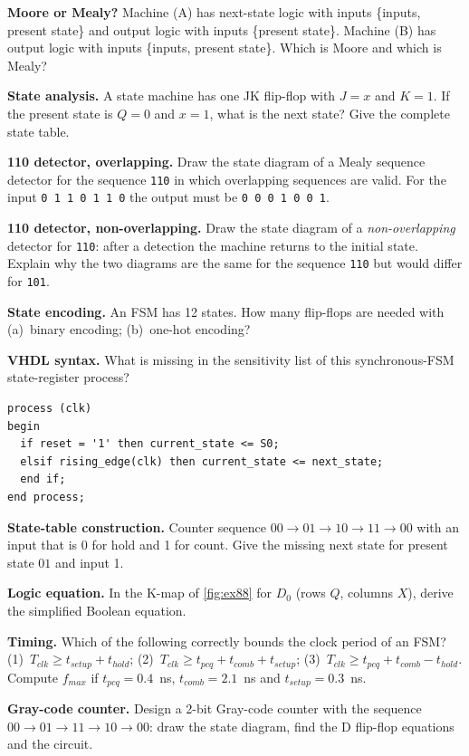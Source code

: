 \begin{exlist}
  \item \textbf{Moore or Mealy?} Machine (A) has next-state logic with inputs \{inputs, present state\} and output logic with inputs \{present state\}. Machine (B) has output logic with inputs \{inputs, present state\}. Which is Moore and which is Mealy?
  \item \textbf{State analysis.} A state machine has one JK flip-flop with $J=x$ and $K=1$. If the present state is $Q=0$ and $x=1$, what is the next state? Give the complete state table.
  \item \textbf{110 detector, overlapping.} Draw the state diagram of a Mealy sequence detector for the sequence \texttt{110} in which overlapping sequences are valid. For the input \texttt{0 1 1 0 1 1 0} the output must be \texttt{0 0 0 1 0 0 1}.
  \item \textbf{110 detector, non-overlapping.} Draw the state diagram of a \emph{non-overlapping} detector for \texttt{110}: after a detection the machine returns to the initial state. Explain why the two diagrams are the same for the sequence \texttt{110} but would differ for \texttt{101}.
  \item \textbf{State encoding.} An FSM has 12 states. How many flip-flops are needed with (a)~binary encoding; (b)~one-hot encoding?
  \item \textbf{VHDL syntax.} What is missing in the sensitivity list of this synchronous-FSM state-register process? \begin{lstlisting}
process (clk)
begin
  if reset = '1' then current_state <= S0;
  elsif rising_edge(clk) then current_state <= next_state;
  end if;
end process;
\end{lstlisting}
  \item \textbf{State-table construction.} Counter sequence $00\to01\to10\to11\to00$ with an input that is 0 for hold and 1 for count. Give the missing next state for present state $01$ and input 1.
  \item \textbf{Logic equation.} In the K-map of \cref{fig:ex88} for $D_0$ (rows $Q$, columns $X$), derive the simplified Boolean equation.
  \item \textbf{Timing.} Which of the following correctly bounds the clock period of an FSM? (1)~$T_{clk}\ge t_{setup}+t_{hold}$; (2)~$T_{clk}\ge t_{pcq}+t_{comb}+t_{setup}$; (3)~$T_{clk}\ge t_{pcq}+t_{comb}-t_{hold}$. Compute $f_{max}$ if $t_{pcq}=0.4$~ns, $t_{comb}=2.1$~ns and $t_{setup}=0.3$~ns.
  \item \textbf{Gray-code counter.} Design a 2-bit Gray-code counter with the sequence $00\to01\to11\to10\to00$: draw the state diagram, find the D flip-flop equations and the circuit.

\end{exlist}
